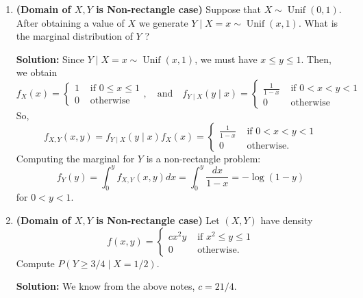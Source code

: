 \documentclass[13pt]{article}
\theoremstyle{definition}
\newenvironment{solution}
{\color{C2}\begin{framed}\begingroup\textbf{Solution:} }
  {\endgroup\end{framed}}
\theoremstyle{remark}
\newenvironment{remark}
  {\pushQED{\qed}\renewcommand{\qedsymbol}{$\triangle$}\remarkx}
  {\popQED\endremarkx}
\begin{document}
\begin{remark}
\begin{enumerate}
\begin{solution}
Earlier we saw that $f_{Y}(y)=y+(1 / 2)$. Hence,
$$
f_{X \mid Y}(x \mid y)=\frac{f_{X, Y}(x, y)}{f_{Y}(y)}=\frac{x+y}{y+\frac{1}{2}} .
$$
So
$$
\begin{aligned}
P\left(X<\frac{1}{4} \mid Y=\frac{1}{3}\right) & =\int_{0}^{1 / 4} f_{X \mid Y}\left(x \mid \frac{1}{3}\right) d x \\
& =\int_{0}^{1 / 4} \frac{x+\frac{1}{3}}{\frac{1}{3}+\frac{1}{2}} d x \\
& =\frac{\frac{1}{32}+\frac{1}{3}}{\frac{1}{3}+\frac{1}{2}} \\
& =\frac{14}{32} .
\end{aligned}
$$
\end{solution}
\item \textbf{(Domain of $X, Y$ is Non-rectangle case)} Suppose that $X \sim \operatorname{Unif}(0,1)$. After obtaining a value of $X$ we generate $Y \mid X=x \sim \operatorname{Unif}(x, 1)$. What is the marginal distribution of $Y$ ? 

\begin{solution}Since $Y \mid X=x \sim \operatorname{Unif}(x, 1)$, we must have $x\le y \le 1$. Then, we obtain
$$
f_{X}(x)= \begin{cases}1 & \text { if } 0 \leq x \leq 1 \\ 0 & \text { otherwise }\end{cases}, \quad \text{and} \quad f_{Y \mid X}(y \mid x)= \begin{cases}\frac{1}{1-x} & \text { if } 0<x<y<1 \\ 0 & \text { otherwise }\end{cases}
$$
So,
$$
f_{X, Y}(x, y)=f_{Y \mid X}(y \mid x) f_{X}(x)= \begin{cases}\frac{1}{1-x} & \text { if } 0<x<y<1 \\ 0 & \text { otherwise. }\end{cases}
$$
Computing the marginal for $Y$ is a non-rectangle problem:
$$
f_{Y}(y)=\int_{0}^{y} f_{X, Y}(x, y) d x=\int_{0}^{y} \frac{d x}{1-x}=-\log (1-y)
$$
for $0<y<1$.
\end{solution}
\item \textbf{(Domain of $X, Y$ is Non-rectangle case)} Let $(X, Y)$ have density
$$
f(x, y)= \begin{cases}c x^{2} y & \text { if } x^{2} \leq y \leq 1 \\ 0 & \text { otherwise. }\end{cases}
$$
Compute $P(Y \geq 3 / 4 \mid X=1 / 2)$.
\begin{solution}
    We know from the above notes, $c=21 / 4$. 
    

\end{solution}
\end{enumerate}
\end{remark}
\end{document}

